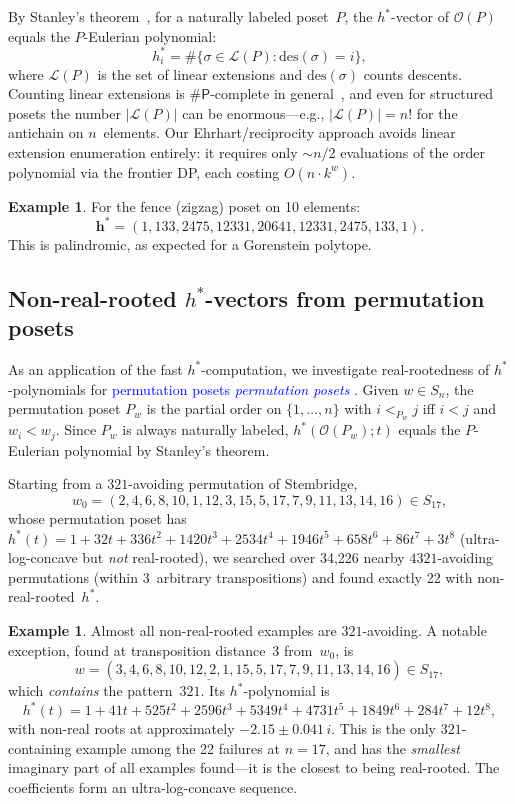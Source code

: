\documentclass[11pt,reqno]{amsart}
\theoremstyle{definition}
\newtheorem{example}[theorem]{Example}
\newcommand{\hvec}{\mathbf{h}^{*}}
\newcommand{\defin}[1]{%
\relax\ifmmode%
\textcolor{blue}{#1}%
\else \textcolor{blue}{\emph{#1}}%
\fi%
}
\begin{document}
By Stanley's theorem~\cite[Thm.~4.5.14]{StanleyEC1},
for a naturally labeled poset~$P$, the $h^*$-vector of
$\mathcal{O}(P)$ equals the $P$-Eulerian polynomial:
\[
  h^*_i = \#\{\sigma \in \mathcal{L}(P) : \mathrm{des}(\sigma) = i\},
\]
where $\mathcal{L}(P)$ is the set of linear extensions and
$\mathrm{des}(\sigma)$ counts descents.
Counting linear extensions is $\#\mathsf{P}$-complete in
general~\cite{BrightwellWinkler1991}, and even for structured posets the
number $|\mathcal{L}(P)|$ can be enormous---e.g., $|\mathcal{L}(P)| = n!$
for the antichain on $n$~elements.  Our Ehrhart/reciprocity approach
avoids linear extension enumeration entirely: it requires only $\sim n/2$
evaluations of the order polynomial via the frontier DP, each costing
$O(n \cdot k^w)$.

\begin{example}\label{ex:fenceHstar}
For the fence (zigzag) poset on 10 elements:
\[
  \hvec = (1, 133, 2475, 12331, 20641, 12331, 2475, 133, 1).
\]
This is palindromic, as expected for a Gorenstein polytope.
\end{example}


\subsection{Non-real-rooted \texorpdfstring{$h^*$}{h*}-vectors from permutation posets}\label{subs:nonRR}

As an application of the fast $h^*$-computation, we investigate
real-rootedness of $h^*$-polynomials for \defin{permutation posets}.
Given $w \in S_n$, the permutation poset $P_w$ is the partial order
on $\{1,\dotsc,n\}$ with $i <_{P_w} j$ iff $i < j$ and $w_i < w_j$.
Since $P_w$ is always naturally labeled, $h^*(\mathcal{O}(P_w); t)$
equals the $P$-Eulerian polynomial by Stanley's theorem.

Starting from a $321$-avoiding permutation of Stembridge,
\[
  w_0 = (2,4,6,8,10,1,12,3,15,5,17,7,9,11,13,14,16) \in S_{17},
\]
whose permutation poset has
$h^*(t) = 1 + 32t + 336t^2 + 1420t^3 + 2534t^4 + 1946t^5 + 658t^6 + 86t^7 + 3t^8$
(ultra-log-concave but \emph{not} real-rooted),
we searched over 34{,}226 nearby $4321$-avoiding permutations
(within 3~arbitrary transpositions) and found exactly 22 with
non-real-rooted~$h^*$.

\begin{example}\label{ex:321containing}
Almost all non-real-rooted examples are $321$-avoiding.
A notable exception, found at transposition distance~3 from~$w_0$, is
\[
  w = (3,4,6,8,10,\underline{12,2,1},15,5,17,7,9,11,13,14,16) \in S_{17},
\]
which \emph{contains} the pattern~$321$. 
 Its $h^*$-polynomial is
\[
  h^*(t) = 1 + 41t + 525t^2 + 2596t^3 + 5349t^4 + 4731t^5 + 1849t^6 + 284t^7 + 12t^8,
\]
with non-real roots at approximately $-2.15 \pm 0.041\,i$.
This is the only $321$-containing example among the 22 failures
at $n = 17$, and has the \emph{smallest} imaginary part of all
examples found---it is the closest to being real-rooted.
The coefficients form an ultra-log-concave sequence.
\end{example}
\end{document}
